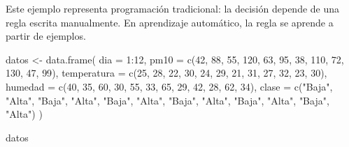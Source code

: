 \documentclass[
  spanish,
  10.5pt,
  letterpaper,
  openany,
  headings=big]{scrbook}
\newenvironment{Shaded}{}{}
\newcommand{\AttributeTok}[1]{\textcolor[rgb]{0.84,0.23,0.29}{#1}}
\newcommand{\DecValTok}[1]{\textcolor[rgb]{0.00,0.36,0.77}{#1}}
\newcommand{\FunctionTok}[1]{\textcolor[rgb]{0.44,0.26,0.76}{#1}}
\newcommand{\NormalTok}[1]{\textcolor[rgb]{0.14,0.16,0.18}{#1}}
\newcommand{\OtherTok}[1]{\textcolor[rgb]{0.44,0.26,0.76}{#1}}
\newcommand{\SpecialCharTok}[1]{\textcolor[rgb]{0.00,0.36,0.77}{#1}}
\newcommand{\StringTok}[1]{\textcolor[rgb]{0.01,0.18,0.38}{#1}}
\begin{document}
\begin{tcolorbox}[enhanced jigsaw, arc=.35mm, bottomrule=.15mm, bottomtitle=1mm, breakable, colback=white, colbacktitle=quarto-callout-tip-color!10!white, colframe=quarto-callout-tip-color-frame, coltitle=black, left=2mm, leftrule=.75mm, opacityback=0, opacitybacktitle=0.6, rightrule=.15mm, title=\textcolor{quarto-callout-tip-color}{\faLightbulb}\hspace{0.5em}{Interpretación del resultado}, titlerule=0mm, toprule=.15mm, toptitle=1mm]

Este ejemplo representa programación tradicional: la decisión depende de
una regla escrita manualmente. En aprendizaje automático, la regla se
aprende a partir de ejemplos.

\end{tcolorbox}

\begin{Shaded}
\begin{Highlighting}[]
\NormalTok{datos }\OtherTok{\textless{}{-}} \FunctionTok{data.frame}\NormalTok{(}
  \AttributeTok{dia =} \DecValTok{1}\SpecialCharTok{:}\DecValTok{12}\NormalTok{,}
  \AttributeTok{pm10 =} \FunctionTok{c}\NormalTok{(}\DecValTok{42}\NormalTok{, }\DecValTok{88}\NormalTok{, }\DecValTok{55}\NormalTok{, }\DecValTok{120}\NormalTok{, }\DecValTok{63}\NormalTok{, }\DecValTok{95}\NormalTok{, }\DecValTok{38}\NormalTok{, }\DecValTok{110}\NormalTok{, }\DecValTok{72}\NormalTok{, }\DecValTok{130}\NormalTok{, }\DecValTok{47}\NormalTok{, }\DecValTok{99}\NormalTok{),}
  \AttributeTok{temperatura =} \FunctionTok{c}\NormalTok{(}\DecValTok{25}\NormalTok{, }\DecValTok{28}\NormalTok{, }\DecValTok{22}\NormalTok{, }\DecValTok{30}\NormalTok{, }\DecValTok{24}\NormalTok{, }\DecValTok{29}\NormalTok{, }\DecValTok{21}\NormalTok{, }\DecValTok{31}\NormalTok{, }\DecValTok{27}\NormalTok{, }\DecValTok{32}\NormalTok{, }\DecValTok{23}\NormalTok{, }\DecValTok{30}\NormalTok{),}
  \AttributeTok{humedad =} \FunctionTok{c}\NormalTok{(}\DecValTok{40}\NormalTok{, }\DecValTok{35}\NormalTok{, }\DecValTok{60}\NormalTok{, }\DecValTok{30}\NormalTok{, }\DecValTok{55}\NormalTok{, }\DecValTok{33}\NormalTok{, }\DecValTok{65}\NormalTok{, }\DecValTok{29}\NormalTok{, }\DecValTok{42}\NormalTok{, }\DecValTok{28}\NormalTok{, }\DecValTok{62}\NormalTok{, }\DecValTok{34}\NormalTok{),}
  \AttributeTok{clase =} \FunctionTok{c}\NormalTok{(}\StringTok{"Baja"}\NormalTok{, }\StringTok{"Alta"}\NormalTok{, }\StringTok{"Baja"}\NormalTok{, }\StringTok{"Alta"}\NormalTok{, }\StringTok{"Baja"}\NormalTok{, }\StringTok{"Alta"}\NormalTok{, }\StringTok{"Baja"}\NormalTok{, }\StringTok{"Alta"}\NormalTok{, }\StringTok{"Baja"}\NormalTok{, }\StringTok{"Alta"}\NormalTok{, }\StringTok{"Baja"}\NormalTok{, }\StringTok{"Alta"}\NormalTok{)}
\NormalTok{)}

\NormalTok{datos}
\end{Highlighting}
\end{Shaded}
\end{document}
